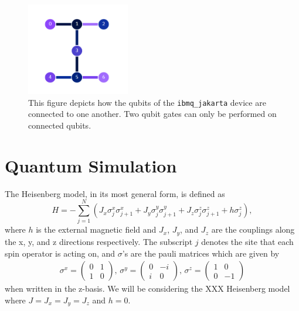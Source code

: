 \documentclass[aps,prl, reprint]{revtex4-2}
\begin{document}
\begin{figure}
\includegraphics[width=0.4\textwidth]{JakartaDiagram.png}
\caption{This figure depicts how the qubits of the \texttt{ibmq\_jakarta} device are connected to one another. Two qubit gates can only be performed on connected qubits.}
\label{fig:JakartaConnect}
\end{figure}

\section{Quantum Simulation}

The Heisenberg model, in its most general form, is defined as
\begin{equation}
H =- \sum_{j=1}^{N}\left(J_{x} \sigma_{j}^{x} \sigma_{j+1}^{x}+J_{y} \sigma_{j}^{y} \sigma_{j+1}^{y}+J_{z} \sigma_{j}^{z} \sigma_{j+1}^{z}+h \sigma_{j}^{z}\right),
\end{equation}
where $h$ is the external magnetic field and $J_x$, $J_y$, and $J_z$ are the couplings along the x, y, and z directions respectively. The subscript $j$ denotes the site that each spin operator is acting on, and $\sigma$'s are the pauli matrices which are given by 
\begin{equation}
\begin{array}{c}
\sigma^{x}=\left(\begin{array}{cc}
0 & 1 \\
1 & 0
\end{array}\right), \,
\sigma^{y}=\left(\begin{array}{cc}
0 & -i \\
i & 0
\end{array}\right),\,
\sigma^{z}=\left(\begin{array}{cc}
1 & 0 \\
0 & -1
\end{array}\right)
\end{array}
\end{equation}
when written in the z-basis. We will be considering the XXX Heisenberg model where $J = J_x = J_y = J_z$ and $h =0$. 
\end{document}
